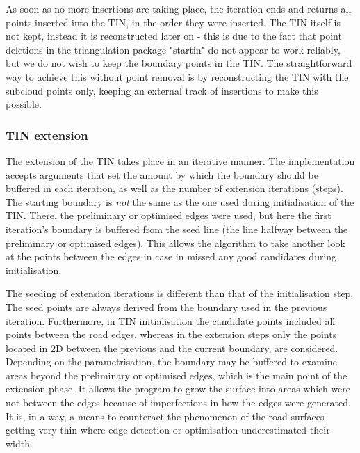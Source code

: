 As soon as no more insertions are taking place, the iteration ends and returns all points inserted into the TIN, in the order they were inserted. The TIN itself is not kept, instead it is reconstructed later on - this is due to the fact that point deletions in the triangulation package "startin" do not appear to work reliably, but we do not wish to keep the boundary points in the TIN. The straightforward way to achieve this without point removal is by reconstructing the TIN with the subcloud points only, keeping an external track of insertions to make this possible.

\subsubsection{TIN extension}

The extension of the TIN takes place in an iterative manner. The implementation accepts arguments that set the amount by which the boundary should be buffered in each iteration, as well as the number of extension iterations (steps). The starting boundary is \textit{not} the same as the one used during initialisation of the TIN. There, the preliminary or optimised edges were used, but here the first iteration's boundary is buffered from the seed line (the line halfway between the preliminary or optimised edges). This allows the algorithm to take another look at the points between the edges in case in missed any good candidates during initialisation.

The seeding of extension iterations is different than that of the initialisation step. The seed points are always derived from the boundary used in the previous iteration. Furthermore, in TIN initialisation the candidate points included all points between the road edges, whereas in the extension steps only the points located in 2D between the previous and the current boundary, are considered. Depending on the parametrisation, the boundary may be buffered to examine areas beyond the preliminary or optimised edges, which is the main point of the extension phase. It allows the program to grow the surface into areas which were not between the edges because of imperfections in how the edges were generated. It is, in a way, a means to counteract the phenomenon of the road surfaces getting very thin where edge detection or optimisation underestimated their width.


